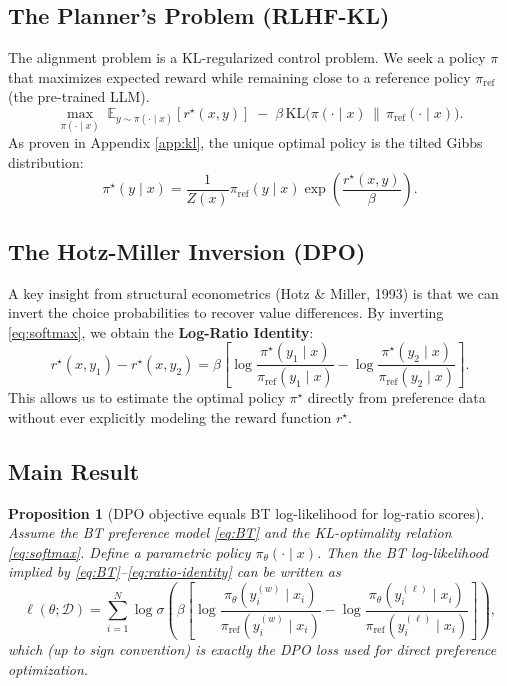 \documentclass[11pt]{article}
\theoremstyle{plain}
\newtheorem{proposition}{Proposition}
\theoremstyle{definition}
\theoremstyle{remark}
\newcommand{\E}{\mathbb{E}}
\newcommand{\KL}{\mathrm{KL}}
\newcommand{\1}{\mathbf{1}}
\newcommand{\sigmoid}{\sigma}
\newcommand{\refpol}{\pi_{\mathrm{ref}}}
\begin{document}
\subsection{The Planner's Problem (RLHF-KL)}
The alignment problem is a KL-regularized control problem. We seek a policy $\pi$ that maximizes expected reward while remaining close to a reference policy $\refpol$ (the pre-trained LLM).
\begin{equation}\label{eq:RLHF-KL}
\max_{\pi(\cdot\mid x)}\;\E_{y\sim \pi(\cdot\mid x)}[r^\star(x,y)] \;-\; \beta\,\KL\big(\pi(\cdot\mid x)\,\|\,\refpol(\cdot\mid x)\big).
\end{equation}
As proven in Appendix \ref{app:kl}, the unique optimal policy is the tilted Gibbs distribution:
\begin{equation}\label{eq:softmax}
\pi^\star(y\mid x) = \frac{1}{Z(x)} \refpol(y\mid x)\exp\left(\frac{r^\star(x,y)}{\beta}\right).
\end{equation}

\subsection{The Hotz-Miller Inversion (DPO)}

A key insight from structural econometrics (Hotz \& Miller, 1993) is that we can invert the choice probabilities to recover value differences.
By inverting \eqref{eq:softmax}, we obtain the \textbf{Log-Ratio Identity}:
\begin{equation}\label{eq:ratio-identity}
r^\star(x,y_1)-r^\star(x,y_2) = \beta \left[ \log\frac{\pi^\star(y_1\mid x)}{\refpol(y_1\mid x)} - \log\frac{\pi^\star(y_2\mid x)}{\refpol(y_2\mid x)} \right].
\end{equation}
This allows us to estimate the optimal policy $\pi^\star$ directly from preference data without ever explicitly modeling the reward function $r^\star$.

\subsection{Main Result}\label{sec:result}

\begin{proposition}[DPO objective equals BT log-likelihood for log-ratio scores]\label{prop:dpo-bt}
Assume the BT preference model \eqref{eq:BT} and the KL-optimality relation \eqref{eq:softmax}.
Define a parametric policy $\pi_\theta(\cdot\mid x)$. Then the BT log-likelihood implied by \eqref{eq:BT}--\eqref{eq:ratio-identity}
can be written as
\[
\ell(\theta;\mathcal{D})
=
\sum_{i=1}^N
\log \sigmoid\!\left(
\beta\left[
\log\frac{\pi_\theta(y^{(w)}_i\mid x_i)}{\refpol(y^{(w)}_i\mid x_i)}
-
\log\frac{\pi_\theta(y^{(\ell)}_i\mid x_i)}{\refpol(y^{(\ell)}_i\mid x_i)}
\right]\right),
\]
which (up to sign convention) is exactly the DPO loss used for direct preference optimization.
\end{proposition}
\end{document}

